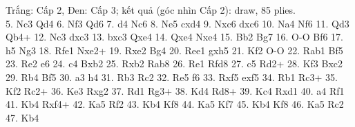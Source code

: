 Trắng: Cấp 2, Đen: Cấp 3; kết quả (góc nhìn Cấp 2): draw, 85 plies.\\
5. Nc3 Qd4 6. Nf3 Qd6 7. d4 Nc6 8. Ne5 cxd4 9. Nxc6 dxc6 10. Na4 Nf6 11. Qd3 Qb4+ 12. Nc3 dxc3 13. bxc3 Qxe4 14. Qxe4 Nxe4 15. Bb2 Bg7 16. O-O Bf6 17. h5 Ng3 18. Rfe1 Nxe2+ 19. Rxe2 Bg4 20. Ree1 gxh5 21. Kf2 O-O 22. Rab1 Bf5 23. Re2 e6 24. c4 Bxb2 25. Rxb2 Rab8 26. Re1 Rfd8 27. c5 Rd2+ 28. Kf3 Bxc2 29. Rb4 Bf5 30. a3 h4 31. Rb3 Rc2 32. Re5 f6 33. Rxf5 exf5 34. Rb1 Rc3+ 35. Kf2 Rc2+ 36. Ke3 Rxg2 37. Rd1 Rg3+ 38. Kd4 Rd8+ 39. Kc4 Rxd1 40. a4 Rf1 41. Kb4 Rxf4+ 42. Ka5 Rf2 43. Kb4 Kf8 44. Ka5 Kf7 45. Kb4 Kf8 46. Ka5 Rc2 47. Kb4

